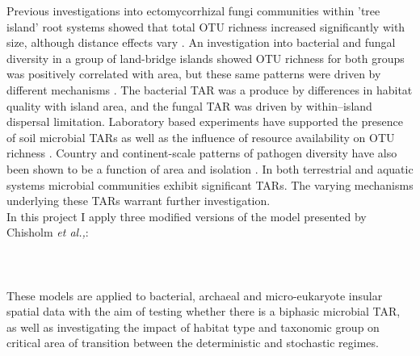 \noindent Previous investigations into ectomycorrhizal fungi communities within 'tree island' root systems showed that total OTU richness increased significantly with size, although distance effects vary \cite{glassman2017theory} \cite{peay2007strong}. An investigation into bacterial and fungal diversity in a group of land-bridge islands showed OTU richness for both groups was positively correlated with area, but these same patterns were driven by different mechanisms \cite{li2020island}. The bacterial TAR was a produce by differences in habitat quality with island area, and the fungal TAR was driven by within--island dispersal limitation. Laboratory based experiments have supported the presence of soil microbial TARs as well as the influence of resource availability on OTU richness \cite{delgado2018experimentally}. Country and continent-scale patterns of pathogen diversity have also been shown to be a function of area and isolation \cite{jean2016equilibrium} \cite{cashdan2014biogeography}. In both terrestrial and aquatic systems microbial communities exhibit significant TARs. The varying mechanisms underlying these TARs warrant further investigation. \\

\noindent In this project I apply three modified versions of the model presented by Chisholm \textit{et al.,}: \\

 \\
 \\
\\

\noindent These models are applied to bacterial, archaeal and micro-eukaryote insular spatial data with the aim of testing whether there is a biphasic microbial TAR, as well as investigating the impact of habitat type and taxonomic group on critical area of transition between the deterministic and stochastic regimes. 